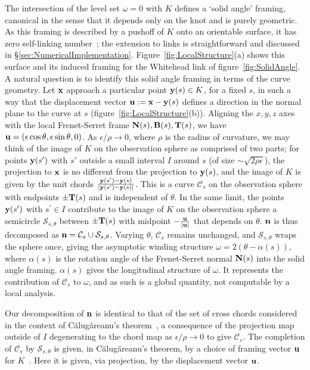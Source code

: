     The intersection of the level set $\omega=0$ with $K$ defines a `solid angle' framing, canonical in the sense that it depends only on the knot and is purely geometric. As this framing is described by a pushoff of $K$ onto an orientable surface, it has zero self-linking number~\citep{Lickorish1997}; the extension to links is straightforward and discussed in \S\ref{sec:NumericalImplementation}. Figure~\ref{fig:LocalStructure}(a) shows this surface and its induced framing for the Whitehead link of figure~\ref{fig:SolidAngle}. A natural question is to identify this solid angle framing in terms of the curve geometry. Let ${\bf x}$ approach a particular point ${\bf y}(s) \in K$, for a fixed $s$, in such a way that the displacement vector ${\bf u} := {\bf x} - {\bf y}(s)$ defines a direction in the normal plane to the curve at $s$ (figure~\ref{fig:LocalStructure}(b)). Aligning the $x,y,z$ axes with the local Frenet-Serret frame ${\bf N}(s),{\bf B}(s),{\bf T}(s)$, we have ${\bf u} = (\epsilon \cos\theta, \epsilon \sin\theta,0)$. As $\epsilon/\rho \rightarrow 0$, where $\rho$ is the radius of curvature, we may think of the image of $K$ on the observation sphere as comprised of two parts; for points ${\bf y}(s')$ with $s'$ outside a small interval $I$ around $s$ (of size $\sim\sqrt{2\rho \epsilon}$), the projection to ${\bf x}$ is no different from the projection to ${\bf y}(s)$, and the image of $K$ is given by the unit chords $\frac{{\bf y}(s') - {\bf y}(s)}{|{\bf y}(s') - {\bf y}(s)|}$. This is a curve $\mathcal{C}_s$ on the observation sphere with endpoints $\pm {\bf T}(s)$ and is independent of $\theta$. In the same limit, the points ${\bf y}(s^{\prime})$ with $s^{\prime}\in I$ contribute to the image of $K$ on the observation sphere a semicircle $\mathcal{S}_{s,\theta}$ between $\pm{\bf T}(s)$ with midpoint $- \frac{{\bf u}}{|{\bf u}|}$ that depends on $\theta$. ${\bf n}$ is thus decomposed as ${\bf n} = \mathcal{C}_s \cup \mathcal{S}_{s,\theta}$. Varying $\theta$, $\mathcal{C}_s$ remains unchanged, and $\mathcal{S}_{s,\theta}$ wraps the sphere once, giving the asymptotic winding structure $\omega = 2(\theta - \alpha(s))$, where $\alpha(s)$ is the rotation angle of the Frenet-Serret normal ${\bf N}(s)$ into the solid angle framing. $\alpha(s)$ gives the longitudinal structure of $\omega$. It represents the contribution of $\mathcal{C}_s$ to $\omega$, and as such is a global quantity, not computable by a local analysis. 

    Our decomposition of ${\bf n}$ is identical to that of the set of cross chords considered in the context of C\u{a}lug\u{a}reanu's theorem~\citep{Dennis2005,Calugareanu1959}, a consequence of the projection map outside of $I$ degenerating to the chord map as $\epsilon/\rho \rightarrow 0$ to give $\mathcal{C}_s$. The completion of $\mathcal{C}_s$ by $\mathcal{S}_{s,\theta}$ is given, in C\u{a}lug\u{a}reanu's theorem, by a choice of framing vector ${\bf u}$ for $K$~\citep{Dennis2005}. Here it is given, via projection, by the displacement vector ${\bf u}$.

